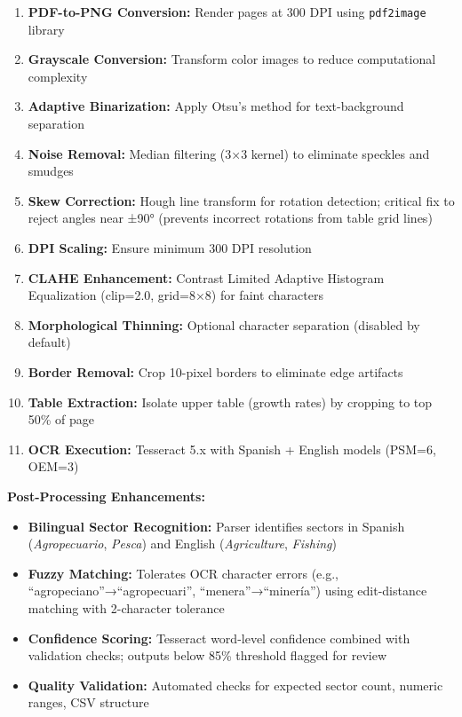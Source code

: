 \documentclass[12pt]{article}
\begin{document}
\begin{enumerate}
\item \textbf{PDF-to-PNG Conversion:} Render pages at 300 DPI using \texttt{pdf2image} library
\item \textbf{Grayscale Conversion:} Transform color images to reduce computational complexity
\item \textbf{Adaptive Binarization:} Apply Otsu's method for text-background separation
\item \textbf{Noise Removal:} Median filtering (3×3 kernel) to eliminate speckles and smudges
\item \textbf{Skew Correction:} Hough line transform for rotation detection; critical fix to reject angles near ±90° (prevents incorrect rotations from table grid lines)
\item \textbf{DPI Scaling:} Ensure minimum 300 DPI resolution
\item \textbf{CLAHE Enhancement:} Contrast Limited Adaptive Histogram Equalization (clip=2.0, grid=8×8) for faint characters
\item \textbf{Morphological Thinning:} Optional character separation (disabled by default)
\item \textbf{Border Removal:} Crop 10-pixel borders to eliminate edge artifacts
\item \textbf{Table Extraction:} Isolate upper table (growth rates) by cropping to top 50\% of page
\item \textbf{OCR Execution:} Tesseract 5.x with Spanish + English models (PSM=6, OEM=3)
\end{enumerate}

\textbf{Post-Processing Enhancements:}
\begin{itemize}
\item \textbf{Bilingual Sector Recognition:} Parser identifies sectors in Spanish (\emph{Agropecuario}, \emph{Pesca}) and English (\emph{Agriculture}, \emph{Fishing})
\item \textbf{Fuzzy Matching:} Tolerates OCR character errors (e.g., ``agropeciano''→``agropecuari'', ``menera''→``minería'') using edit-distance matching with 2-character tolerance
\item \textbf{Confidence Scoring:} Tesseract word-level confidence combined with validation checks; outputs below 85\% threshold flagged for review
\item \textbf{Quality Validation:} Automated checks for expected sector count, numeric ranges, CSV structure
\end{itemize}
\end{document}
